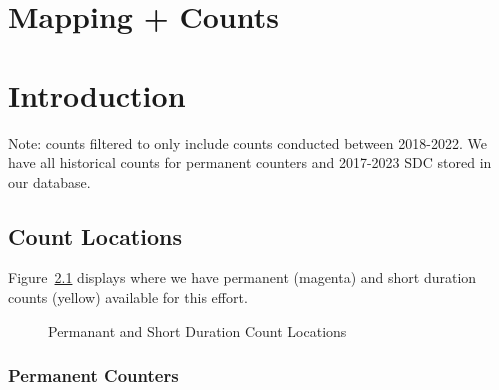 \documentclass[
  letterpaper,
]{scrbook}
\begin{document}
\hypertarget{mapping-counts}{%
\chapter{Mapping + Counts}\label{mapping-counts}}

\hypertarget{introduction}{%
\chapter{Introduction}\label{introduction}}

Note: counts filtered to only include counts conducted between
2018-2022. We have all historical counts for permanent counters and
2017-2023 SDC stored in our database.

\hypertarget{count-locations}{%
\section{Count Locations}\label{count-locations}}

Figure~\ref{fig-count_locs} displays where we have permanent (magenta)
and short duration counts (yellow) available for this effort.

\begin{figure}

{\centering 

}

\caption{\label{fig-count_locs}Permanant and Short Duration Count
Locations}

\end{figure}

\hypertarget{permanent-counters}{%
\subsection{Permanent Counters}\label{permanent-counters}}
\end{document}
